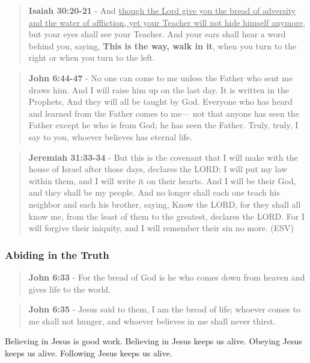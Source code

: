 \documentclass[11pt]{article}
\begin{document}
\begin{quote}
\textbf{Isaiah 30:20-21} - And \uline{though the Lord give you the bread of adversity and the water of affliction, yet your Teacher will not hide himself anymore}, but your eyes shall see your Teacher. And your ears shall hear a word behind you, saying, \textbf{This is the way, walk in it}, when you turn to the right or when you turn to the left.
\end{quote}

\begin{quote}
\textbf{John 6:44-47} - No one can come to me unless the Father who sent me draws him. And I will raise him up on the last day. It is written in the Prophets, And they will all be taught by God. Everyone who has heard and learned from the Father comes to me— not that anyone has seen the Father except he who is from God; he has seen the Father. Truly, truly, I say to you, whoever believes has eternal life.
\end{quote}

\begin{quote}
\textbf{Jeremiah 31:33-34} - But this is the covenant that I will make with the house of Israel after those days, declares the LORD: I will put my law within them, and I will write it on their hearts.  And I will be their God, and they shall be my people.  And no longer shall each one teach his neighbor and each his brother, saying, Know the LORD, for they shall all know me, from the least of them to the greatest, declares the LORD.  For I will forgive their iniquity, and I will remember their sin no more.  (ESV)
\end{quote}

\subsubsection{Abiding in the Truth}
\label{sec:org82e37db}
\begin{quote}
\textbf{John 6:33} - For the bread of God is he who comes down from heaven and gives life to the world.
\end{quote}

\begin{quote}
\textbf{John 6:35} - Jesus said to them, I am the bread of life; whoever comes to me shall not hunger, and whoever believes in me shall never thirst.
\end{quote}

Believing in Jesus is good work.
Believing in Jesus keeps us alive.
Obeying Jesus keeps us alive.
Following Jesus keeps us alive.
\end{document}
